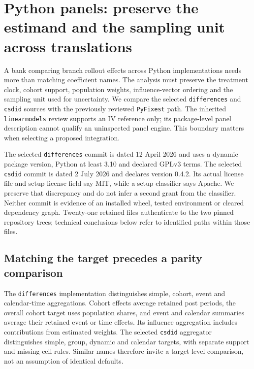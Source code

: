 \section{Python panels: preserve the estimand and the sampling unit across translations}
\label{sec:exec24-panels-python}

A bank comparing branch rollout effects across Python implementations needs
more than matching coefficient names. The analysis must preserve the treatment
clock, cohort support, population weights, influence-vector ordering and the
sampling unit used for uncertainty. We compare the selected \texttt{differences}
and \texttt{csdid} sources with the previously reviewed \texttt{PyFixest}
path. The inherited \texttt{linearmodels} review supports an IV reference only;
its package-level panel description cannot qualify an uninspected panel engine.
This boundary matters when selecting a proposed integration.
\citep{exec24_panelpy_contract,exec23_pyfixest_reuse_source,exec22_linearmodels_reuse}

The selected \texttt{differences} commit is dated 12 April 2026 and uses a
dynamic package version, Python at least 3.10 and declared GPLv3 terms.
The selected \texttt{csdid} commit is dated 2 July 2026 and declares version
0.4.2. Its actual license file and setup license field say MIT, while a setup
classifier says Apache. We preserve that discrepancy and do not infer a
second grant from the classifier. Neither commit is evidence of an installed
wheel, tested environment or cleared dependency graph. Twenty-one retained
files authenticate to the two pinned repository trees; technical conclusions
below refer to identified paths within those files.
\citep{exec24_panelpy_differences,exec24_panelpy_csdid}

\subsection{Matching the target precedes a parity comparison}
The \texttt{differences} implementation distinguishes simple, cohort,
event and calendar-time aggregations. Cohort effects average retained post
periods, the overall cohort target uses population shares, and event and
calendar summaries average their retained event or time effects. Its influence
aggregation includes contributions from estimated weights. The selected
\texttt{csdid} aggregator distinguishes simple, group, dynamic and calendar
targets, with separate support and missing-cell rules. Similar names therefore
invite a target-level comparison, not an assumption of identical defaults.
\citep{exec24_panelpy_differences,exec24_panelpy_csdid}

